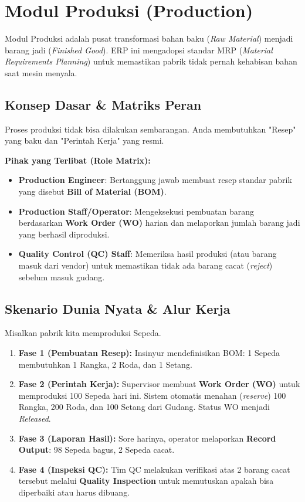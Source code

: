 \chapter{Modul Produksi (Production)}

Modul Produksi adalah pusat transformasi bahan baku (\textit{Raw Material}) menjadi barang jadi (\textit{Finished Good}). ERP ini mengadopsi standar MRP (\textit{Material Requirements Planning}) untuk memastikan pabrik tidak pernah kehabisan bahan saat mesin menyala.

\section{Konsep Dasar \& Matriks Peran}
Proses produksi tidak bisa dilakukan sembarangan. Anda membutuhkan "Resep" yang baku dan "Perintah Kerja" yang resmi.

\textbf{Pihak yang Terlibat (Role Matrix):}
\begin{itemize}
    \item \textbf{Production Engineer}: Bertanggung jawab membuat resep standar pabrik yang disebut \textbf{Bill of Material (BOM)}.
    \item \textbf{Production Staff/Operator}: Mengeksekusi pembuatan barang berdasarkan \textbf{Work Order (WO)} harian dan melaporkan jumlah barang jadi yang berhasil diproduksi.
    \item \textbf{Quality Control (QC) Staff}: Memeriksa hasil produksi (atau barang masuk dari vendor) untuk memastikan tidak ada barang cacat (\textit{reject}) sebelum masuk gudang.
\end{itemize}

\section{Skenario Dunia Nyata \& Alur Kerja}
Misalkan pabrik kita memproduksi Sepeda.
\begin{enumerate}
    \item \textbf{Fase 1 (Pembuatan Resep):} Insinyur mendefinisikan BOM: 1 Sepeda membutuhkan 1 Rangka, 2 Roda, dan 1 Setang.
    \item \textbf{Fase 2 (Perintah Kerja):} Supervisor membuat \textbf{Work Order (WO)} untuk memproduksi 100 Sepeda hari ini. Sistem otomatis menahan (\textit{reserve}) 100 Rangka, 200 Roda, dan 100 Setang dari Gudang. Status WO menjadi \textit{Released}.
    \item \textbf{Fase 3 (Laporan Hasil):} Sore harinya, operator melaporkan \textbf{Record Output}: 98 Sepeda bagus, 2 Sepeda cacat.
    \item \textbf{Fase 4 (Inspeksi QC):} Tim QC melakukan verifikasi atas 2 barang cacat tersebut melalui \textbf{Quality Inspection} untuk memutuskan apakah bisa diperbaiki atau harus dibuang.
\end{enumerate}

